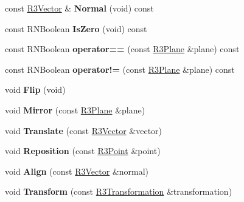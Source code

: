 \begin{DoxyCompactItemize}
\item 
const \hyperlink{class_r3_vector}{R3\+Vector} \& {\bfseries Normal} (void) const \hypertarget{class_r3_plane_a452eb15038e7bbb158b0f867e5f3910f}{}\label{class_r3_plane_a452eb15038e7bbb158b0f867e5f3910f}

\item 
const R\+N\+Boolean {\bfseries Is\+Zero} (void) const \hypertarget{class_r3_plane_a884abb0a86507fce9ce5a686c868132d}{}\label{class_r3_plane_a884abb0a86507fce9ce5a686c868132d}

\item 
const R\+N\+Boolean {\bfseries operator==} (const \hyperlink{class_r3_plane}{R3\+Plane} \&plane) const \hypertarget{class_r3_plane_ac4bca7b2e588a10f5f9cee718c2147f1}{}\label{class_r3_plane_ac4bca7b2e588a10f5f9cee718c2147f1}

\item 
const R\+N\+Boolean {\bfseries operator!=} (const \hyperlink{class_r3_plane}{R3\+Plane} \&plane) const \hypertarget{class_r3_plane_aa07d42ab7e258bd5a2086639dc42b0f7}{}\label{class_r3_plane_aa07d42ab7e258bd5a2086639dc42b0f7}

\item 
void {\bfseries Flip} (void)\hypertarget{class_r3_plane_a399d994f1f32e5a75160b79ae4cfa0dd}{}\label{class_r3_plane_a399d994f1f32e5a75160b79ae4cfa0dd}

\item 
void {\bfseries Mirror} (const \hyperlink{class_r3_plane}{R3\+Plane} \&plane)\hypertarget{class_r3_plane_af981ff44702809575b31552b516cf2ed}{}\label{class_r3_plane_af981ff44702809575b31552b516cf2ed}

\item 
void {\bfseries Translate} (const \hyperlink{class_r3_vector}{R3\+Vector} \&vector)\hypertarget{class_r3_plane_a9238ad30b04c849208c14db912feef27}{}\label{class_r3_plane_a9238ad30b04c849208c14db912feef27}

\item 
void {\bfseries Reposition} (const \hyperlink{class_r3_point}{R3\+Point} \&point)\hypertarget{class_r3_plane_addeebe71bce54d80829059dd6ebda6ee}{}\label{class_r3_plane_addeebe71bce54d80829059dd6ebda6ee}

\item 
void {\bfseries Align} (const \hyperlink{class_r3_vector}{R3\+Vector} \&normal)\hypertarget{class_r3_plane_a71c9ed3bce285ebc0f0299c8abbfc2fc}{}\label{class_r3_plane_a71c9ed3bce285ebc0f0299c8abbfc2fc}

\item 
void {\bfseries Transform} (const \hyperlink{class_r3_transformation}{R3\+Transformation} \&transformation)\hypertarget{class_r3_plane_ad405ade9bd052aa58c35e2f8d753f525}{}\label{class_r3_plane_ad405ade9bd052aa58c35e2f8d753f525}


\end{DoxyCompactItemize}
